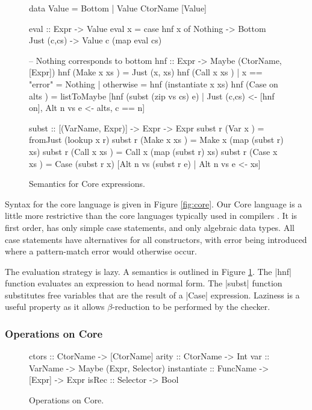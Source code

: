 \documentclass[preprint]{sigplanconf}
\begin{document}
\begin{figure}
\begin{code}
data Value = Bottom | Value CtorName [Value]

eval :: Expr -> Value
eval x = case  hnf x of
               Nothing      -> Bottom
               Just (c,cs)  -> Value c (map eval cs)

-- Nothing corresponds to bottom
hnf :: Expr -> Maybe (CtorName, [Expr])
hnf (Make  x   xs    )  =  Just (x, xs)
hnf (Call  x   xs    )  |  x == "error"  = Nothing
                        |  otherwise     = hnf (instantiate x xs)
hnf (Case  on  alts  )  =  listToMaybe [hnf (subst (zip vs cs) e)
       | Just (c,cs) <- [hnf on], Alt n vs e <- alts, c == n]

subst :: [(VarName, Expr)] -> Expr -> Expr
subst r (Var   x     ) = fromJust (lookup x r)
subst r (Make  x xs  ) = Make  x (map (subst r) xs)
subst r (Call  x xs  ) = Call  x (map (subst r) xs)
subst r (Case  x xs  ) = Case (subst r x)
    [Alt n vs (subst r e) | Alt n vs e <- xs]
\end{code}
\caption{Semantics for Core expressions.}
\label{fig:semantics}
\end{figure}

Syntax for the core language is given in Figure \ref{fig:core}. Our Core language is a little more restrictive than the core languages typically used in compilers \citep{ghc_core}. It is first order, has only simple case statements, and only algebraic data types. All case statements have alternatives for all constructors, with error being introduced where a pattern-match error would otherwise occur.

The evaluation strategy is lazy. A semantics is outlined in Figure \ref{fig:semantics}. The |hnf| function evaluates an expression to head normal form. The |subst| function substitutes free variables that are the result of a |Case| expression. Laziness is a useful property as it allows $\beta$-reduction to be performed by the checker.

\subsubsection{Operations on Core}

\begin{figure}
\begin{code}
ctors        :: CtorName  -> [CtorName]
arity        :: CtorName  -> Int
var          :: VarName   -> Maybe (Expr, Selector)
instantiate  :: FuncName  -> [Expr] -> Expr
isRec        :: Selector  -> Bool
\end{code}
\caption{Operations on Core.}
\label{fig:core_operations}
\end{figure}
\end{document}
